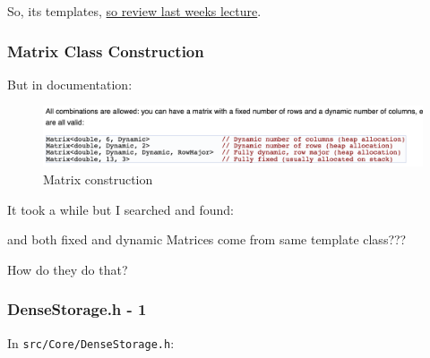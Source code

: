 So, its templates,
\href{http://development.rc.ucl.ac.uk/training/rcwithcpp/session02/}{so
review last weeks lecture}.

\subsubsection{Matrix Class
Construction}\label{matrix-class-construction}

But in documentation:

\begin{figure}[htbp]
\centering
\includegraphics{88cpplibraries/figures/eigenMatrixDynamic.png}
\caption{Matrix construction}
\end{figure}

It took a while but I searched and found:

\begin{Shaded}
\begin{Highlighting}[]
  \NormalTok{;}
\end{Highlighting}
\end{Shaded}

and both fixed and dynamic Matrices come from same template class???

How do they do that?

\subsubsection{DenseStorage.h - 1}\label{densestorage.h---1}

In \texttt{src/Core/DenseStorage.h}:

\begin{Shaded}
\end{Shaded}

